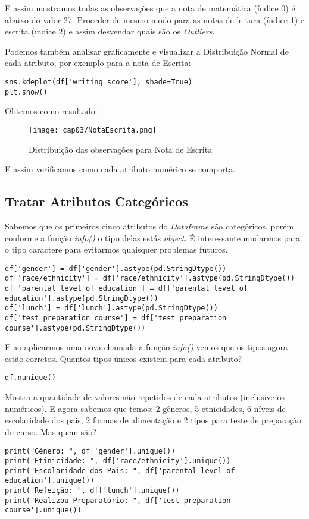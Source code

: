 E assim mostramos todas as observações que a nota de matemática (índice 0) é abaixo do valor 27. Proceder de mesmo modo para as notas de leitura (índice 1) e escrita (índice 2) e assim desvendar quais são os \textit{Outliers}.

Podemos também analisar graficamente e visualizar a Distribuição Normal de cada atributo, por exemplo para a nota de Escrita:
\begin{lstlisting}[]
sns.kdeplot(df['writing score'], shade=True)
plt.show()
\end{lstlisting}

Obtemos como resultado:
\begin{figure}[H]
	\centering
	\texttt{[image: cap03/NotaEscrita.png]}
	\caption{Distribuição das observações para Nota de Escrita}
\end{figure}

E assim verificamos como cada atributo numérico se comporta.

\subsection{Tratar Atributos Categóricos}
Sabemos que os primeiros cinco atributos do \textit{Dataframe} são categóricos, porém conforme a função \textit{info()} o tipo delas estás \textit{object}. É interessante mudarmos para o tipo caractere para evitarmos quaisquer problemas futuros.
\begin{lstlisting}[]
df['gender'] = df['gender'].astype(pd.StringDtype())
df['race/ethnicity'] = df['race/ethnicity'].astype(pd.StringDtype())
df['parental level of education'] = df['parental level of education'].astype(pd.StringDtype())
df['lunch'] = df['lunch'].astype(pd.StringDtype())
df['test preparation course'] = df['test preparation course'].astype(pd.StringDtype())
\end{lstlisting}

E ao aplicarmos uma nova chamada a função \textit{info()} vemos que os tipos agora estão corretos. Quantos tipos únicos existem para cada atributo?
\begin{lstlisting}[]
df.nunique()
\end{lstlisting}

Mostra a quantidade de valores não repetidos de cada atributos (inclusive os numéricos). E agora sabemos que temos: 2 gêneros, 5 etnicidades, 6 níveis de escolaridade dos pais, 2 formas de alimentação e 2 tipos para teste de preparação do curso. Mas quem são?
\begin{lstlisting}[]
print("Gênero: ", df['gender'].unique())
print("Etinicidade: ", df['race/ethnicity'].unique())
print("Escolaridade dos Pais: ", df['parental level of education'].unique())
print("Refeição: ", df['lunch'].unique())
print("Realizou Preparatório: ", df['test preparation course'].unique())
\end{lstlisting}

